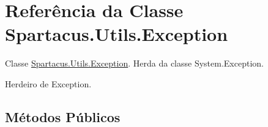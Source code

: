 \hypertarget{classSpartacus_1_1Utils_1_1Exception}{\section{Referência da Classe Spartacus.\+Utils.\+Exception}
\label{classSpartacus_1_1Utils_1_1Exception}
}


Classe \hyperlink{classSpartacus_1_1Utils_1_1Exception}{Spartacus.\+Utils.\+Exception}. Herda da classe System.\+Exception.  




Herdeiro de Exception.

\subsection*{Métodos Públicos}
